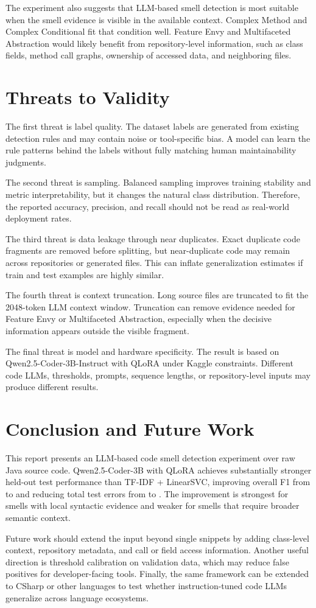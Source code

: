 \documentclass[11pt,a4paper]{article}
\begin{document}
The experiment also suggests that LLM-based smell detection is most suitable when the smell evidence is visible in the available context. Complex Method and Complex Conditional fit that condition well. Feature Envy and Multifaceted Abstraction would likely benefit from repository-level information, such as class fields, method call graphs, ownership of accessed data, and neighboring files.

\section{Threats to Validity}
The first threat is label quality. The dataset labels are generated from existing detection rules and may contain noise or tool-specific bias. A model can learn the rule patterns behind the labels without fully matching human maintainability judgments.

The second threat is sampling. Balanced sampling improves training stability and metric interpretability, but it changes the natural class distribution. Therefore, the reported accuracy, precision, and recall should not be read as real-world deployment rates.

The third threat is data leakage through near duplicates. Exact duplicate code fragments are removed before splitting, but near-duplicate code may remain across repositories or generated files. This can inflate generalization estimates if train and test examples are highly similar.

The fourth threat is context truncation. Long source files are truncated to fit the 2048-token LLM context window. Truncation can remove evidence needed for Feature Envy or Multifaceted Abstraction, especially when the decisive information appears outside the visible fragment.

The final threat is model and hardware specificity. The result is based on Qwen2.5-Coder-3B-Instruct with QLoRA under Kaggle constraints. Different code LLMs, thresholds, prompts, sequence lengths, or repository-level inputs may produce different results.

\section{Conclusion and Future Work}
This report presents an LLM-based code smell detection experiment over raw Java source code. Qwen2.5-Coder-3B with QLoRA achieves substantially stronger held-out test performance than TF-IDF + LinearSVC, improving overall F1 from \baselinefione{} to \qwenfione{} and reducing total test errors from \baselineerrors{} to \qwenerrors{}. The improvement is strongest for smells with local syntactic evidence and weaker for smells that require broader semantic context.

Future work should extend the input beyond single snippets by adding class-level context, repository metadata, and call or field access information. Another useful direction is threshold calibration on validation data, which may reduce false positives for developer-facing tools. Finally, the same framework can be extended to CSharp or other languages to test whether instruction-tuned code LLMs generalize across language ecosystems.



\end{document}
